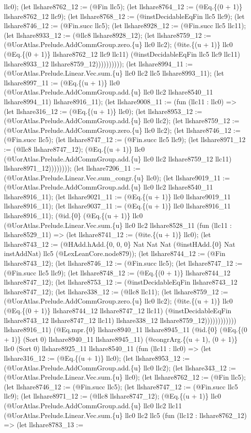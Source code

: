 \documentclass[11pt]{article}
\begin{document}
llc0); (let llshare8762\_12 := (@Fin llc5); (let llshare8764\_12 := (@Eq.\{(0 + 1)\} llshare8762\_12 llc9); (let llshare8768\_12 := (@instDecidableEqFin llc5 llc9); (let llshare8746\_12 := (@Fin.succ llc5); (let llshare8928\_12 := (@Fin.succ llc5 llc11); (let llshare8933\_12 := (@llc8 llshare8928\_12); (let llshare8759\_12 := (@UorAtlas.Prelude.AddCommGroup.zero.\{u\} llc0 llc2); (@ite.\{(u + 1)\} llc0 (@Eq.\{(0 + 1)\} llshare8762\_12 llc9 llc11) (@instDecidableEqFin llc5 llc9 llc11) llshare8933\_12 llshare8759\_12)))))))))); (let llshare8994\_11 := (@UorAtlas.Prelude.Linear.Vec.sum.\{u\} llc0 llc2 llc5 llshare8993\_11); (let llshare8997\_11 := (@Eq.\{(u + 1)\} llc0 (@UorAtlas.Prelude.AddCommGroup.add.\{u\} llc0 llc2 llshare8540\_11 llshare8994\_11) llshare8916\_11); (let llshare9008\_11 := (fun (llc11 : llc0) => (let llshare316\_12 := (@Eq.\{(u + 1)\} llc0); (let llshare8953\_12 := (@UorAtlas.Prelude.AddCommGroup.add.\{u\} llc0 llc2); (let llshare8759\_12 := (@UorAtlas.Prelude.AddCommGroup.zero.\{u\} llc0 llc2); (let llshare8746\_12 := (@Fin.succ llc5); (let llshare8747\_12 := (@Fin.succ llc5 llc9); (let llshare8971\_12 := (@llc8 llshare8747\_12); (@Eq.\{(u + 1)\} llc0 (@UorAtlas.Prelude.AddCommGroup.add.\{u\} llc0 llc2 llshare8759\_12 llc11) llshare8971\_12)))))))); (let llshare7206\_11 := (@UorAtlas.Prelude.Linear.Vec.sum\_congr.\{u\} llc0); (let llshare9019\_11 := (@UorAtlas.Prelude.AddCommGroup.add.\{u\} llc0 llc2 llshare8540\_11 llshare8916\_11); (let llshare9021\_11 := (@Eq.\{(u + 1)\} llc0 llshare9019\_11 llshare8916\_11); (let llshare9037\_11 := (@Eq.\{(u + 1)\} llc0 llshare8916\_11 llshare8916\_11); (@id.\{0\} (@Eq.\{(u + 1)\} llc0 (@UorAtlas.Prelude.Linear.Vec.sum.\{u\} llc0 llc2 llshare8528\_11 (fun (llc11 : llshare8529\_11) => (let llshare8741\_12 := (@ite.\{(u + 1)\} llc0); (let llshare8743\_12 := (@HAdd.hAdd.\{0, 0, 0\} Nat Nat Nat (@instHAdd.\{0\} Nat instAddNat) llc5 (@LexLeanCore.node879)); (let llshare8744\_12 := (@Fin llshare8743\_12); (let llshare8746\_12 := (@Fin.succ llc5); (let llshare8747\_12 := (@Fin.succ llc5 llc9); (let llshare8748\_12 := (@Eq.\{(0 + 1)\} llshare8744\_12 llshare8747\_12); (let llshare8753\_12 := (@instDecidableEqFin llshare8743\_12 llshare8747\_12); (let llshare338\_12 := (@llc8 llc11); (let llshare8759\_12 := (@UorAtlas.Prelude.AddCommGroup.zero.\{u\} llc0 llc2); (@ite.\{(u + 1)\} llc0 (@Eq.\{(0 + 1)\} llshare8744\_12 llshare8747\_12 llc11) (@instDecidableEqFin llshare8743\_12 llshare8747\_12 llc11) llshare338\_12 llshare8759\_12)))))))))))) llshare8916\_11) (@Eq.mpr.\{0\} llshare8940\_11 llshare8945\_11 (@id.\{0\} (@Eq.\{(0 + 1)\} (Sort 0) llshare8940\_11 llshare8945\_11) (@congrArg.\{(u + 1), (0 + 1)\} llc0 (Sort 0) llshare8925\_11 llshare8540\_11 (fun (llc11 : llc0) => (let llshare316\_12 := (@Eq.\{(u + 1)\} llc0); (let llshare8953\_12 := (@UorAtlas.Prelude.AddCommGroup.add.\{u\} llc0 llc2); (let llshare343\_12 := (@UorAtlas.Prelude.Linear.Vec.sum.\{u\} llc0); (let llshare8762\_12 := (@Fin llc5); (let llshare8746\_12 := (@Fin.succ llc5); (let llshare8747\_12 := (@Fin.succ llc5 llc9); (let llshare8971\_12 := (@llc8 llshare8747\_12); (@Eq.\{(u + 1)\} llc0 (@UorAtlas.Prelude.AddCommGroup.add.\{u\} llc0 llc2 llc11 (@UorAtlas.Prelude.Linear.Vec.sum.\{u\} llc0 llc2 llc5 (fun (llc12 : llshare8762\_12) => (let llshare8783\_13 := 
\end{document}
